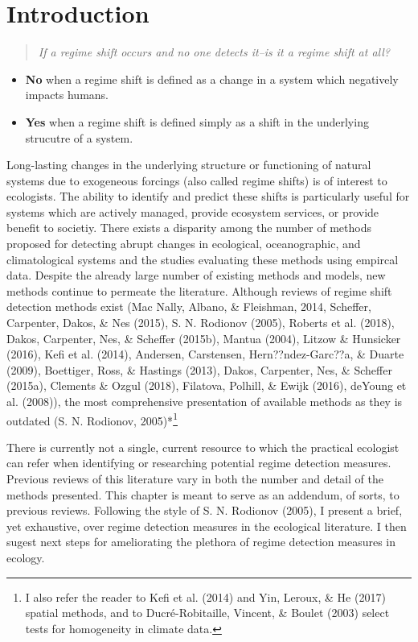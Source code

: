 \documentclass[12pt,twoside,openany]{reedthesis}
\providecommand{\tightlist}{%
  \setlength{\itemsep}{0pt}\setlength{\parskip}{0pt}}
\begin{document}
\section{Introduction}\label{introduction}
\begin{quote}
\emph{If a regime shift occurs and no one detects it--is it a regime
shift at all?}
\end{quote}
\begin{itemize}
\tightlist
\item
  \textbf{No} when a regime shift is defined as a change in a system
  which negatively impacts humans.
\item
  \textbf{Yes} when a regime shift is defined simply as a shift in the
  underlying strucutre of a system.
\end{itemize}
Long-lasting changes in the underlying structure or functioning of
natural systems due to exogeneous forcings (also called regime shifts)
is of interest to ecologists. The ability to identify and predict these
shifts is particularly useful for systems which are actively managed,
provide ecosystem services, or provide benefit to societiy. There exists
a disparity among the number of methods proposed for detecting abrupt
changes in ecological, oceanographic, and climatological systems and the
studies evaluating these methods using empircal data. Despite the
already large number of existing methods and models, new methods
continue to permeate the literature. Although reviews of regime shift
detection methods exist (Mac Nally, Albano, \& Fleishman, 2014,
Scheffer, Carpenter, Dakos, \& Nes (2015), S. N. Rodionov (2005),
Roberts et al. (2018), Dakos, Carpenter, Nes, \& Scheffer (2015b),
Mantua (2004), Litzow \& Hunsicker (2016), Kefi et al. (2014), Andersen,
Carstensen, Hern??ndez-Garc??a, \& Duarte (2009), Boettiger, Ross, \&
Hastings (2013), Dakos, Carpenter, Nes, \& Scheffer (2015a), Clements \&
Ozgul (2018), Filatova, Polhill, \& Ewijk (2016), deYoung et al.
(2008)), the most comprehensive presentation of available methods as
they is outdated (S. N. Rodionov, 2005)*\footnote{I also refer the
  reader to Kefi et al. (2014) and Yin, Leroux, \& He (2017) spatial
  methods, and to Ducré-Robitaille, Vincent, \& Boulet (2003) select
  tests for homogeneity in climate data.}

There is currently not a single, current resource to which the practical
ecologist can refer when identifying or researching potential regime
detection measures. Previous reviews of this literature vary in both the
number and detail of the methods presented. This chapter is meant to
serve as an addendum, of sorts, to previous reviews. Following the style
of S. N. Rodionov (2005), I present a brief, yet exhaustive, over regime
detection measures in the ecological literature. I then sugest next
steps for ameliorating the plethora of regime detection measures in
ecology.
\end{document}

